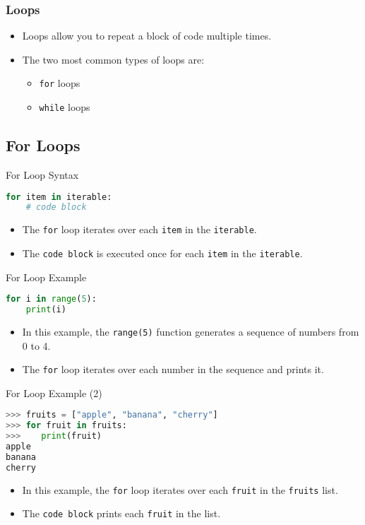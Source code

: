 \begin{frame}
    \frametitle{Loops}
    \begin{itemize}
        \item Loops allow you to repeat a block of code multiple times.
        \item The two most common types of loops are:
        \begin{itemize}
            \item \texttt{for} loops
            \item \texttt{while} loops
        \end{itemize}
    \end{itemize}           
\end{frame}
\subsection{For Loops}
\begin{frame}[fragile]{For Loop Syntax}
    \begin{lstlisting}[style=colorful, language=Python]
for item in iterable:
    # code block
    \end{lstlisting}
    \begin{itemize}
        \item The \texttt{for} loop iterates over each \texttt{item} in the \texttt{iterable}.
        \item The \texttt{code block} is executed once for each \texttt{item} in the \texttt{iterable}.
    \end{itemize}
\end{frame}

\begin{frame}[fragile]{For Loop Example}
    \begin{lstlisting}[style=colorful, language=Python]
for i in range(5):
    print(i)
    \end{lstlisting}
    \begin{itemize}
        \item In this example, the \texttt{range(5)} function generates a sequence of numbers from 0 to 4.
        \item The \texttt{for} loop iterates over each number in the sequence and prints it.
    \end{itemize}
\end{frame}

\begin{frame}[fragile]{For Loop Example (2)}
    \begin{lstlisting}[style=colorful, language=Python]
>>> fruits = ["apple", "banana", "cherry"]
>>> for fruit in fruits:
>>>    print(fruit)
apple
banana
cherry
    \end{lstlisting}
    \begin{itemize}
        \item In this example, the \texttt{for} loop iterates over each \texttt{fruit} in the \texttt{fruits} list.
        \item The \texttt{code block} prints each \texttt{fruit} in the list.
    \end{itemize}
\end{frame}

